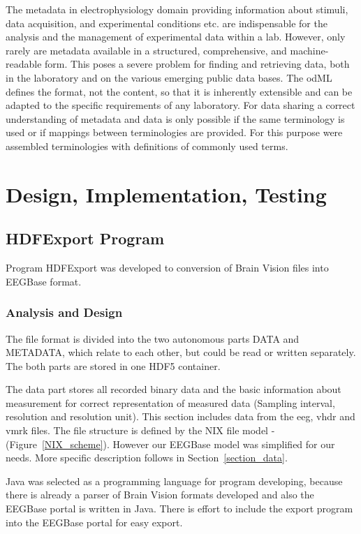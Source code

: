 \documentclass[conference]{IEEEtran}
\begin{document}
The metadata in electrophysiology domain providing information about stimuli, data acquisition, and experimental conditions etc. are indispensable for the analysis and the management of experimental data within a lab. However, only rarely are metadata available in a structured, comprehensive, and machine-readable form. This poses a severe problem for finding and retrieving data, both in the laboratory and on the various emerging public data bases. \cite{odml} The odML defines the format, not the content, so that it is inherently extensible and can be adapted to the specific requirements of any laboratory. For data sharing a correct understanding of metadata and data is only possible if the same terminology is used or if mappings between terminologies are provided. For this purpose were assembled terminologies with definitions of commonly used terms. \cite{odmlarticle}




\section{Design, Implementation, Testing}


\subsection{HDFExport Program}

Program HDFExport was developed to conversion of Brain Vision files into EEGBase format.
\subsubsection {Analysis and Design}
The file format is divided into the two autonomous parts DATA and METADATA, which relate to each other, but could be read or written separately. The both parts are stored in one HDF5 container.

The data part stores all recorded binary data and the basic information about measurement for correct representation of measured data (Sampling interval, resolution and resolution unit). This section includes data from the eeg, vhdr and vmrk files. The file structure is defined by the NIX file model - (Figure~\ref{NIX_scheme}). However our EEGBase model was simplified for our needs. More specific description follows in Section~\ref{section_data}.

Java was selected as a programming language for program developing, because there is already a parser of Brain Vision formats developed and also the EEGBase portal is written in Java. There is effort to include the export program into the EEGBase portal for easy export.
\end{document}
